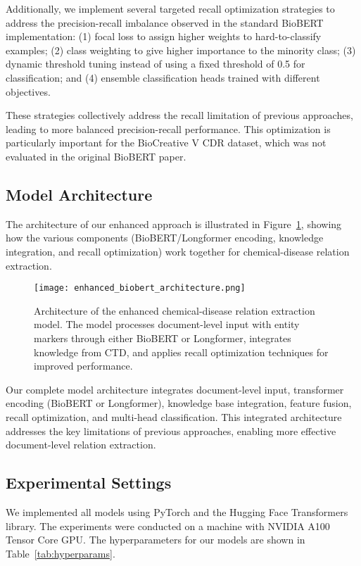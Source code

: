 \documentclass{amia}
\begin{document}
Additionally, we implement several targeted recall optimization strategies to address the precision-recall imbalance observed in the standard BioBERT implementation: (1) focal loss to assign higher weights to hard-to-classify examples; (2) class weighting to give higher importance to the minority class; (3) dynamic threshold tuning instead of using a fixed threshold of 0.5 for classification; and (4) ensemble classification heads trained with different objectives.

These strategies collectively address the recall limitation of previous approaches, leading to more balanced precision-recall performance. This optimization is particularly important for the BioCreative V CDR dataset, which was not evaluated in the original BioBERT paper.

\subsection*{Model Architecture}

The architecture of our enhanced approach is illustrated in Figure~\ref{fig}, showing how the various components (BioBERT/Longformer encoding, knowledge integration, and recall optimization) work together for chemical-disease relation extraction.

\begin{figure}[H]
\centering
\texttt{[image: enhanced\_biobert\_architecture.png]}
\caption{Architecture of the enhanced chemical-disease relation extraction model. The model processes document-level input with entity markers through either BioBERT or Longformer, integrates knowledge from CTD, and applies recall optimization techniques for improved performance.}
\label{fig}
\end{figure}

Our complete model architecture integrates document-level input, transformer encoding (BioBERT or Longformer), knowledge base integration, feature fusion, recall optimization, and multi-head classification. This integrated architecture addresses the key limitations of previous approaches, enabling more effective document-level relation extraction.

\subsection*{Experimental Settings}

We implemented all models using PyTorch and the Hugging Face Transformers library. The experiments were conducted on a machine with NVIDIA A100 Tensor Core GPU. The hyperparameters for our models are shown in Table~\ref{tab:hyperparams}.
\end{document}

